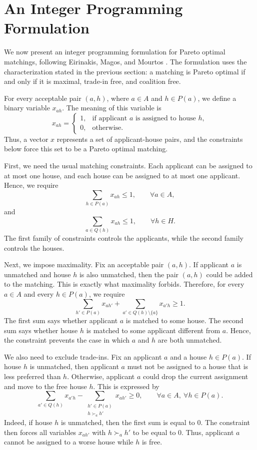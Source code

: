 \documentclass[12pt]{report}
\numberwithin{algorithm}{chapter}
\begin{document}
\section{An Integer Programming Formulation}
	
	We now present an integer programming formulation for Pareto optimal matchings,
	following Eirinakis, Magos, and Mourtos \cite{eirinakis2015model}. The formulation uses the
	characterization stated in the previous section: a matching is Pareto optimal if
	and only if it is maximal, trade-in free, and coalition free.
	
	For every acceptable pair $(a,h)$, where $a\in A$ and $h\in P(a)$, we define a
	binary variable $x_{ah}$. The meaning of this variable is
	\[
	x_{ah}=
	\begin{cases}
		1, & \text{if applicant } a \text{ is assigned to house } h,\\
		0, & \text{otherwise.}
	\end{cases}
	\]
	Thus, a vector $x$ represents a set of applicant-house pairs, and the constraints below
	force this set to be a Pareto optimal matching.
	
	First, we need the usual matching constraints. Each applicant can be assigned to at
	most one house, and each house can be assigned to at most one applicant. Hence, we
	require
	\[
	\sum_{h\in P(a)} x_{ah} \leq 1,
	\qquad \forall a\in A,
	\]
	and
	\[
	\sum_{a\in Q(h)} x_{ah} \leq 1,
	\qquad \forall h\in H.
	\]
	The first family of constraints controls the applicants, while the second family
	controls the houses.
	
	Next, we impose maximality. Fix an acceptable pair $(a,h)$. If applicant $a$ is
	unmatched and house $h$ is also unmatched, then the pair $(a,h)$ could be added
	to the matching. This is exactly what maximality forbids. Therefore, for every
	$a\in A$ and every $h\in P(a)$, we require
	\[
	\sum_{h'\in P(a)} x_{ah'}
	+
	\sum_{a'\in Q(h)\setminus\{a\}} x_{a'h}
	\geq 1.
	\]
	The first sum says whether applicant $a$ is matched to some house. The second sum
	says whether house $h$ is matched to some applicant different from $a$. Hence, the
	constraint prevents the case in which $a$ and $h$ are both unmatched.
	
	We also need to exclude trade-ins. Fix an applicant $a$ and a house $h\in P(a)$.
	If house $h$ is unmatched, then applicant $a$ must not be assigned to a house that
	is less preferred than $h$. Otherwise, applicant $a$ could drop the current assignment and move to the free house $h$. This is expressed by
	\[
	\sum_{a'\in Q(h)} x_{a'h}
	-
	\sum_{\substack{h'\in P(a)\\ h \succ_{a} h'}} x_{ah'}
	\geq 0,
	\qquad \forall a\in A,\ \forall h\in P(a).
	\]
	Indeed, if house $h$ is unmatched, then the first sum is equal to $0$. The
	constraint then forces all variables $x_{ah'}$ with $h \succ_{a} h'$ to be equal to $0$.
	Thus, applicant $a$ cannot be assigned to a worse house while $h$ is free.
	
\end{document}
